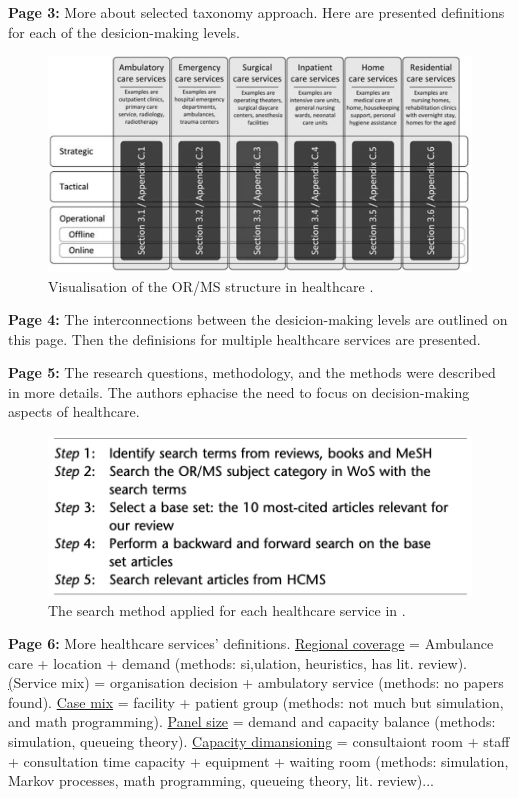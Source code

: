     \textbf{Page 3:}
    More about selected taxonomy approach. Here are presented definitions for each of the desicion-making levels.
    \begin{figure}[H]
        \centering
        \includegraphics[width=1\textwidth]{figures/SR0011NL12/fig1.png}
        \caption{Visualisation of the OR/MS structure in healthcare \cite{x029}.}
        \label{fig1:SR0011NL12}
    \end{figure}

    \textbf{Page 4:}
    The interconnections between the desicion-making levels are outlined on this page. Then the definisions for multiple healthcare services are presented.

    \textbf{Page 5:}
    The research questions, methodology, and the methods were described in more details. The authors ephacise the need to focus on decision-making aspects of healthcare.
    \begin{figure}[H]
        \centering
        \includegraphics[width=1\textwidth]{figures/SR0011NL12/fig2.png}
        \caption{The search method applied for each healthcare service in \cite{x029}.}
        \label{fig2:SR0011NL12}
    \end{figure}
    
    \textbf{Page 6:}
    More healthcare services' definitions. \underline{Regional coverage} = Ambulance care + location + demand (methods: si,ulation, heuristics, has lit. review). \underline(Service mix) = organisation decision + ambulatory service (methods: no papers found). \underline{Case mix} = facility + patient group (methods: not much but simulation, and math programming). \underline{Panel size} = demand and capacity balance (methods: simulation, queueing theory). \underline{Capacity dimansioning} = consultaiont room + staff + consultation time capacity + equipment + waiting room (methods: simulation, Markov processes, math programming, queueing theory, lit. review)...
    
